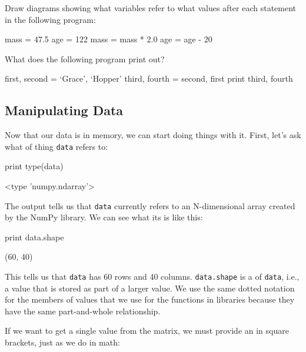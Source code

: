 \documentclass{book}
\begin{document}
\begin{challenge}
  Draw diagrams showing what variables refer to what values after each
  statement in the following program:

\begin{VerbIn}
mass = 47.5
age = 122
mass = mass * 2.0
age = age - 20
\end{VerbIn}
\end{challenge}

\begin{challenge}
  What does the following program print out?
\begin{VerbIn}
first, second = `Grace', `Hopper'
third, fourth = second, first
print third, fourth
\end{VerbIn}
\end{challenge}

\subsection{Manipulating Data}

Now that our data is in memory, we can start doing things with it.
First, let's ask what  of thing
\texttt{data} refers to:

\begin{VerbIn}
print type(data)
\end{VerbIn}

\begin{VerbOut}
<type 'numpy.ndarray'>
\end{VerbOut}

The output tells us that \texttt{data} currently refers to an
N-dimensional array created by the NumPy library. We can see what its
 is like this:

\begin{VerbIn}
print data.shape
\end{VerbIn}

\begin{VerbOut}
(60, 40)
\end{VerbOut}

This tells us that \texttt{data} has 60 rows and 40 columns.
\texttt{data.shape} is a  of \texttt{data},
i.e., a value that is stored as part of a larger value. We use the same
dotted notation for the members of values that we use for the functions
in libraries because they have the same part-and-whole relationship.

If we want to get a single value from the matrix, we must provide an
 in square brackets, just as we do in math:
\end{document}

